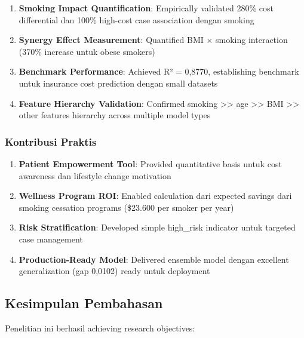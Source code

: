 \begin{enumerate}
    \item \textbf{Smoking Impact Quantification}: Empirically validated 280\% cost differential dan 100\% high-cost case association dengan smoking

    \item \textbf{Synergy Effect Measurement}: Quantified BMI × smoking interaction (370\% increase untuk obese smokers)

    \item \textbf{Benchmark Performance}: Achieved R² = 0,8770, establishing benchmark untuk insurance cost prediction dengan small datasets

    \item \textbf{Feature Hierarchy Validation}: Confirmed smoking >> age >> BMI >> other features hierarchy across multiple model types
\end{enumerate}

\subsubsection{Kontribusi Praktis}

\begin{enumerate}
    \item \textbf{Patient Empowerment Tool}: Provided quantitative basis untuk cost awareness dan lifestyle change motivation

    \item \textbf{Wellness Program ROI}: Enabled calculation dari expected savings dari smoking cessation programs (\$23.600 per smoker per year)

    \item \textbf{Risk Stratification}: Developed simple high\_risk indicator untuk targeted case management

    \item \textbf{Production-Ready Model}: Delivered ensemble model dengan excellent generalization (gap 0,0102) ready untuk deployment
\end{enumerate}

\subsection{Kesimpulan Pembahasan}
\label{subsec:kesimpulan-pembahasan}

Penelitian ini berhasil achieving research objectives:

